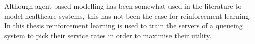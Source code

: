 Although agent-based modelling has been somewhat used in the literature to
model healthcare systems, this has not been the case for reinforcement
learning.
In this thesis reinforcement learning is used to train the servers of a
queueing system to pick their service rates in order to maximise their
utility.

